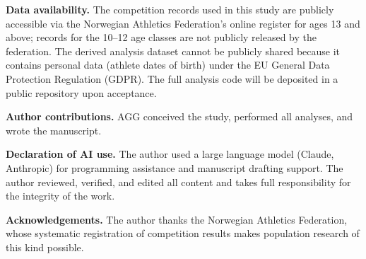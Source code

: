 \documentclass[12pt,a4paper]{article}
\begin{document}
\medskip\noindent\textbf{Data availability.} The competition records used in this study are publicly accessible via the Norwegian Athletics Federation's online register for ages 13 and above; records for the 10--12 age classes are not publicly released by the federation. The derived analysis dataset cannot be publicly shared because it contains personal data (athlete dates of birth) under the EU General Data Protection Regulation (GDPR). The full analysis code will be deposited in a public repository upon acceptance.

\medskip\noindent\textbf{Author contributions.} AGG conceived the study, performed all analyses, and wrote the manuscript.

\medskip\noindent\textbf{Declaration of AI use.} The author used a large language model (Claude, Anthropic) for programming assistance and manuscript drafting support. The author reviewed, verified, and edited all content and takes full responsibility for the integrity of the work.

\medskip\noindent\textbf{Acknowledgements.} The author thanks the Norwegian Athletics Federation, whose systematic registration of competition results makes population research of this kind possible.





\end{document}
